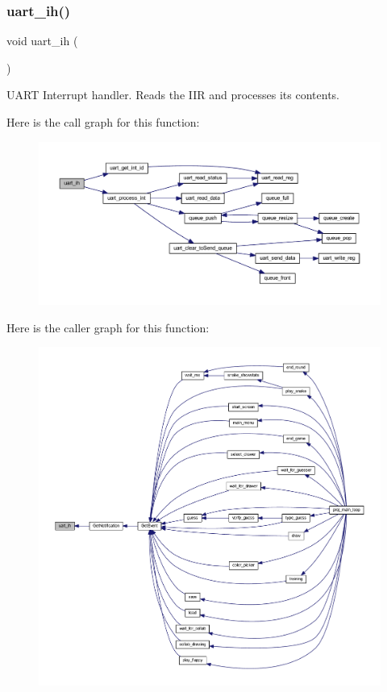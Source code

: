 \subsubsection{\texorpdfstring{uart\+\_\+ih()}{uart\_ih()}}
{\footnotesize\ttfamily void uart\+\_\+ih (\begin{DoxyParamCaption}{ }\end{DoxyParamCaption})}



U\+A\+RT Interrupt handler. Reads the I\+IR and processes its contents. 

Here is the call graph for this function\+:\nopagebreak
\begin{figure}[H]
\begin{center}
\leavevmode
\includegraphics[width=350pt]{group__uart_ga67d2da4dd20c731989c130bbe2cd4c85_cgraph}
\end{center}
\end{figure}
Here is the caller graph for this function\+:\nopagebreak
\begin{figure}[H]
\begin{center}
\leavevmode
\includegraphics[width=350pt]{group__uart_ga67d2da4dd20c731989c130bbe2cd4c85_icgraph}
\end{center}
\end{figure}
\mbox{\label{group__uart_ga1eb7fd21c4d53e035f6d522a81563ac2}} 
